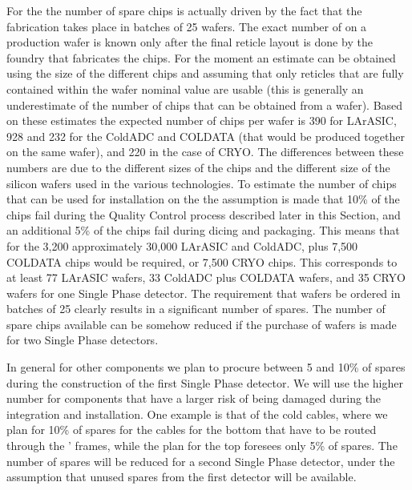 For the  the number of
spare chips is actually driven by the fact that the fabrication
takes place in batches of 25 wafers. The exact number of  
on a production wafer is known only after the final reticle layout
is done by the foundry that fabricates the chips. For the moment
an estimate can be obtained using the size of the different 
chips and assuming that only reticles that are fully contained
within the wafer nominal value are usable (this is generally
an underestimate of the number of chips that can be obtained 
from a wafer). Based on these estimates the expected number
of chips per wafer is 390 for LArASIC, 928 and 232 for the ColdADC
and COLDATA (that would be produced together on the same wafer),
and 220 in the case of CRYO. The differences between these
numbers are due to the different sizes of the chips and the
different size of the silicon wafers used in the various 
technologies. To estimate the number of chips that can be
used for installation on the  the assumption is
made that 10\% of the chips fail during the Quality Control
process described later in this Section, and an additional
5\% of the chips fail during dicing and packaging. This means
that for the 3,200  approximately 30,000 LArASIC and
ColdADC, plus 7,500 COLDATA chips would be required, or 7,500
CRYO chips. This corresponds to at least 77 LArASIC wafers,
33 ColdADC plus COLDATA wafers, and 35 CRYO wafers for one
Single Phase detector. The requirement that wafers be ordered
in batches of 25 clearly results in a significant number of
spares. The number of spare chips available can be somehow
reduced if the purchase of wafers is made for two Single
Phase detectors. 

In general for other components we plan to procure between 5 and
10\% of spares during the construction of the first Single Phase
detector. We will use the higher number for components that have
a larger risk of being damaged during the integration and 
installation. One example is that of the cold cables, where we
plan for 10\% of spares for the cables for the bottom 
that have to be routed through the ' frames, while
the plan for the top  foresees only 5\% of spares.
The number of spares will be reduced for a second Single Phase
detector, under the assumption that unused spares from the first
detector will be available.


